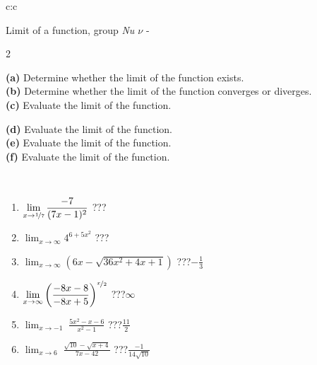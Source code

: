 \documentclass[10pt]{report}
\begin{document}
\newpage
\thispagestyle{empty}
\begin{tabular}{c:c}
\begin{minipage}[c][104.5mm][t]{0.5\linewidth}
\begin{center}
\vspace{5mm}
{\huge Limit of a function, group \textit{Nu $\nu$} -}\\[5mm]
\begin{minipage}{0.95\linewidth}
\begin{center}
{\small \begin{multicols}{2} \raggedright
\textbf{(a)} Determine whether the limit of the function exists. \\[1mm]
\textbf{(b)} Determine whether the limit of the function converges or diverges. \\[1mm]
\textbf{(c)} Evaluate the limit of the function. \par \columnbreak
\textbf{(d)} Evaluate the limit of the function. \\[1mm]
\textbf{(e)} Evaluate the limit of the function. \\[1mm]
\textbf{(f)} Evaluate the limit of the function. \\[1mm]
\end{multicols}
}
\end{center}
\end{minipage}
\\[1mm]
\begin{minipage}{0.79\linewidth}
\begin{center}
\begin{varwidth}{\linewidth}
\setlength{\itemsep}{0pt}
\begin{enumerate}
\normalsize
\item $\displaystyle\lim_{x\to\nicefrac{1}{7}}{\frac{-7}{(7x-1)^{2}}}$\quad \dotfill\; ???\;\dotfill \quad {}
\item $\displaystyle\lim_{x\to\infty}{4^{6+5x^2}}$\quad \dotfill\; ???\;\dotfill \quad {}
\item $\displaystyle\lim_{x\to\infty}{\left(6x - \sqrt{36x^2+4x+1}\right)}$\quad \dotfill\; ???\;\dotfill \quad $-\frac{1}{3}$
\item $\displaystyle\lim_{x\to\infty}{\left( \frac{-8x-8}{-8x+5} \right)^{\nicefrac{x}{2}}}$\quad \dotfill\; ???\;\dotfill \quad $\infty$
\item $\displaystyle\lim_{x\to -1}{\;\frac{5x^2-x-6}{x^2-1}}$\quad \dotfill\; ???\;\dotfill \quad $\frac{11}{2}$
\item $\displaystyle\lim_{x\to 6}{\;\frac{\sqrt{10}-\sqrt{x+4}}{7x-42}}$\quad \dotfill\; ???\;\dotfill \quad $\frac{-1}{14\sqrt{10}}$

\end{enumerate}
\end{varwidth}
\end{center}
\end{minipage}
\end{center}
\end{minipage}
\end{tabular}
\end{document}
